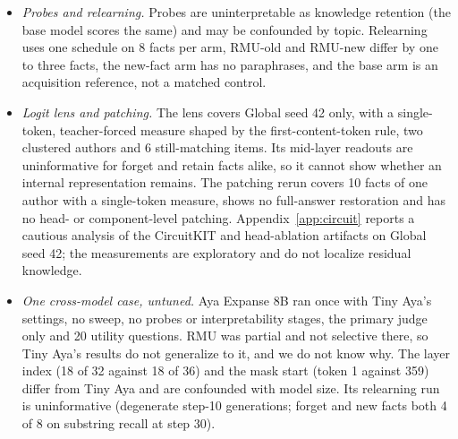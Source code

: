 \documentclass[10pt,twocolumn]{article}
\begin{document}
\begin{itemize}
  \item \emph{Probes and relearning.} Probes are uninterpretable as knowledge retention (the base model scores the same) and may be confounded by topic. Relearning uses one schedule on 8 facts per arm, RMU-old and RMU-new differ by one to three facts, the new-fact arm has no paraphrases, and the base arm is an acquisition reference, not a matched control.
  \item \emph{Logit lens and patching.} The lens covers Global seed 42 only, with a single-token, teacher-forced measure shaped by the first-content-token rule, two clustered authors and 6 still-matching items. Its mid-layer readouts are uninformative for forget and retain facts alike, so it cannot show whether an internal representation remains. The patching rerun covers 10 facts of one author with a single-token measure, shows no full-answer restoration and has no head- or component-level patching. Appendix~\ref{app:circuit} reports a cautious analysis of the CircuitKIT and head-ablation artifacts on Global seed 42; the measurements are exploratory and do not localize residual knowledge.
  \item \emph{One cross-model case, untuned.} Aya Expanse 8B ran once with Tiny Aya's settings, no sweep, no probes or interpretability stages, the primary judge only and 20 utility questions. RMU was partial and not selective there, so Tiny Aya's results do not generalize to it, and we do not know why. The layer index (18 of 32 against 18 of 36) and the mask start (token 1 against 359) differ from Tiny Aya and are confounded with model size. Its relearning run is uninformative (degenerate step-10 generations; forget and new facts both 4 of 8 on substring recall at step 30).

\end{itemize}
\end{document}
